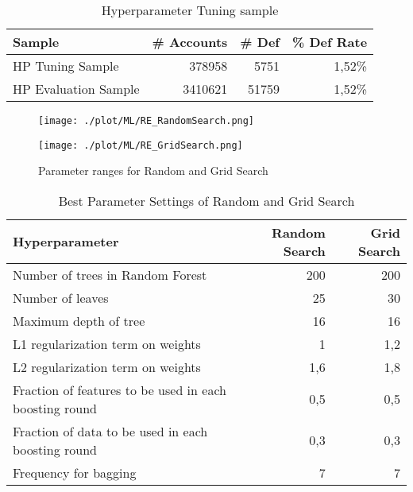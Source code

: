 \begin{table}[H]
\centering
\begin{tabular}{lrrr} \toprule
\textbf{Sample}      & \textbf{\# Accounts} & \textbf{\# Def} & \textbf{\% Def Rate} \\\midrule
HP Tuning Sample     & 378958               & 5751            & 1,52\%               \\
HP Evaluation Sample & 3410621              & 51759           & 1,52\%           \\\bottomrule   
\end{tabular}
\caption{Hyperparameter Tuning sample}
\label{re_hptunsample}
\end{table}

\begin{figure}[H]
\begin{minipage}{.7\textwidth}
	\centering
	\texttt{[image: ./plot/ML/RE\_RandomSearch.png]}
\end{minipage}%
\begin{minipage}{.3\textwidth}
	\centering
	\texttt{[image: ./plot/ML/RE\_GridSearch.png]}
\end{minipage}
    \caption{Parameter ranges for Random and Grid Search}
    \label{fig:re_hpsearch}
\end{figure}

\begin{table}[H]
\centering
\begin{tabular}{lrr}\toprule
\textbf{Hyperparameter}                                & \textbf{Random Search} & \textbf{Grid Search} \\\midrule
Number of trees in Random Forest                       & 200                                & 200                              \\
Number of leaves                                       & 25                                 & 30                               \\
Maximum depth of tree                                  & 16                                 & 16                               \\
L1 regularization term on weights                      & 1                                  & 1,2                              \\
L2 regularization term on weights                      & 1,6                                & 1,8                              \\
Fraction of features to be used in each boosting round & 0,5                                & 0,5                              \\
Fraction of data to be used in each boosting round     & 0,3                                & 0,3                              \\
Frequency for bagging                                  & 7                                  & 7                               \\\bottomrule
\end{tabular}
\caption{Best Parameter Settings of Random and Grid Search}
\label{tab:best_rand_grid}
\end{table}

